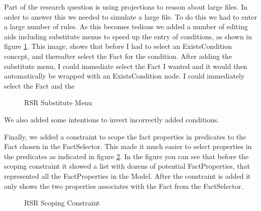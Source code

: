 Part of the research question is using projections to reason about large files.
In order to answer this we needed to simulate a large file.
To do this we had to enter a large number of rules.
As this becomes tedious we added a number of editing aids including substitute menus to speed up the entry of conditions, as shown in figure \ref{fig:RSRSubstituteMenu}.
This image, shows that before I had to select an ExistsCondition concept, and thereafter select the Fact for the condition.
After adding the substitute menu, I could immediate select the Fact I wanted and it would then automatically be wrapped with an ExistsCondition node.
I could immediately select the Fact and the 

\begin{figure}[h]
    \centering
    \caption{RSR Substitute Menu}
    \label{fig:RSRSubstituteMenu}
\end{figure}

We also added some intentions to invert incorrectly added conditions.

Finally, we added a constraint to scope the fact properties in predicates to the Fact chosen in the FactSelector.
This made it much easier to select properties in the predicates as indicated in figure \ref{fig:RSRConstraint}.
In the figure you can see that before the scoping constraint it showed a list with dozens of potential FactProperties, that represented all the FactProperties in the Model.
After the constraint is added it only shows the two properties associates with the Fact from the FactSelector.

\begin{figure}[h]
    \centering
    \caption{RSR Scoping Constraint}
    \label{fig:RSRConstraint}
\end{figure}

